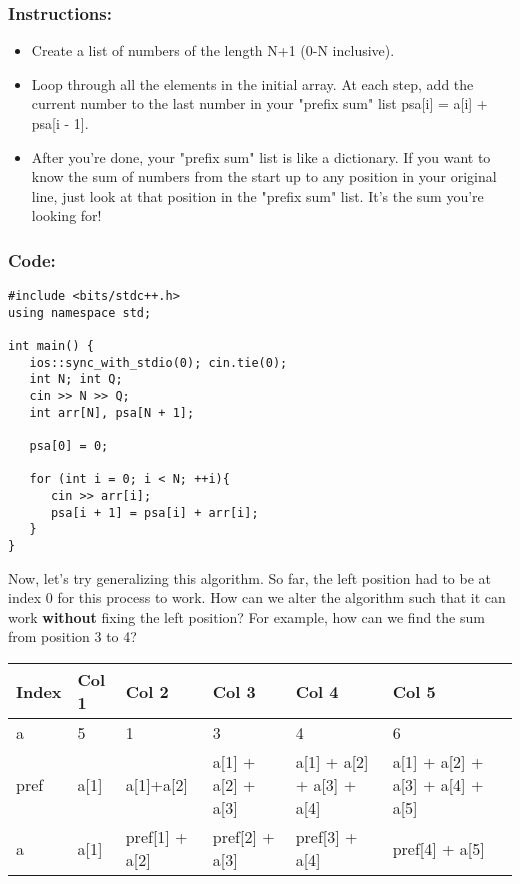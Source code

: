 \documentclass{report}
\begin{document}
\subsubsection*{Instructions:}
\begin{itemize}
    \item Create a list of numbers of the length N+1 (0-N inclusive). 
    \item Loop through all the elements in the initial array. At each step, add the current number to the last number in your "prefix sum" list psa[i] = a[i] + psa[i - 1].
    \item After you're done, your "prefix sum" list is like a dictionary. If you want to know the sum of numbers from the start up to any position in your original line, just look at that position in the "prefix sum" list. It's the sum you're looking for!

\end{itemize}

\subsubsection{Code: }
\begin{lstlisting}[caption=Prefix Sum]
#include <bits/stdc++.h>
using namespace std;

int main() {
   ios::sync_with_stdio(0); cin.tie(0);
   int N; int Q;
   cin >> N >> Q;
   int arr[N], psa[N + 1];

   psa[0] = 0;

   for (int i = 0; i < N; ++i){
      cin >> arr[i];
      psa[i + 1] = psa[i] + arr[i];
   }
}
\end{lstlisting}

Now, let’s try generalizing this algorithm. So far, the left position had to be at index 0 for this process to work. How can we alter the algorithm such that it can work \textbf{without} fixing the left position? For example, how can we find the sum from position 3 to 4?

\begin{table}[ht]
    \centering
    \begin{tabularx}{\linewidth}{|X|X|X|X|X|X|X|}
        \hline
        \cellcolor{gray!25} \textbf{Index} & \cellcolor{gray!25} \textbf{Col 1} & \cellcolor{gray!25} \textbf{Col 2} & \cellcolor{gray!25} \textbf{Col 3} & \cellcolor{gray!25} \textbf{Col 4} & \cellcolor{gray!25} \textbf{Col 5} \\
        \hline
        \cellcolor{gray!25}a & 5 & 1 & 3 & 4 & 6 \\
        \hline
        \cellcolor{gray!25}pref & a[1] & a[1]+a[2] & a[1] + a[2] + a[3] & a[1] + a[2] + a[3] + a[4] & a[1] + a[2] + a[3] + a[4] + a[5] \\
        \hline
        \cellcolor{gray!25}a & a[1] & pref[1] + a[2] & pref[2] + a[3] & pref[3] + a[4] & pref[4] + a[5] \\
        \hline
    \end{tabularx}
\end{table}
\end{document}

